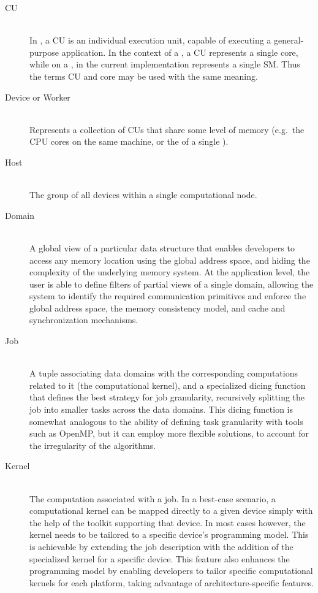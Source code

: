 \documentclass[main.tex]{subfiles}
\begin{document}
\begin{description}
  \item[\acf{CU}] \hfill \\
    In \gama, a \acl{CU} is an individual execution unit, capable of executing a general-purpose application. In the context of a \cpu, a \acl{CU} represents a single core, while on a \gpu, in the current implementation represents a single \acf{SM}. Thus the terms \ac{CU} and core may be used with the same meaning.

  \item[Device or Worker] \hfill \\
    Represents a collection of \aclp{CU} that share some level of memory (e.g.\ the CPU cores on the same machine, or the \sms  of a single \gpu).

  \item[Host] \hfill \\
    The group of all devices within a single computational node.

  \item[Domain] \hfill \\
    A global view of a particular data structure that enables developers to access any memory location using the global address space, and hiding the complexity of the underlying memory system. At the application level, the user is able to define filters of partial views of a single domain, allowing the system to identify the required communication primitives and enforce the global address space, the memory consistency model, and cache and synchronization mechanisms.

  \item[Job] \hfill \\
    A tuple associating data domains with the corresponding computations related to it (the computational kernel), and a specialized dicing function that defines the best strategy for job granularity, recursively splitting the job into smaller tasks across the data domains. This dicing function is somewhat analogous to the ability of defining task granularity with tools such as \acs{OpenMP}, but it can employ more flexible solutions, to account for the irregularity of the algorithms.

  \item[Kernel] \hfill \\
    The computation associated with a job. In a best-case scenario, a computational kernel can be mapped directly to a given device simply with the help of the toolkit supporting that device. In most cases however, the kernel needs to be tailored to a specific device's programming model. This is achievable by extending the job description with the addition of the specialized kernel for a specific device. This feature also enhances the programming model by enabling developers to tailor specific computational kernels for each platform, taking advantage of architecture-specific features.


\end{description}
\end{document}
